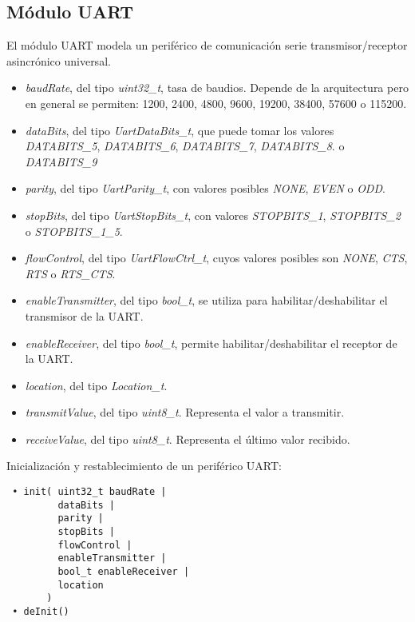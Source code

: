\subsection{Módulo UART}

El módulo UART modela un periférico de comunicación serie transmisor/receptor asincrónico universal.


\begin{itemize}
\item
\emph{baudRate}, del tipo \emph{uint32\_t}, tasa de baudios. Depende de la arquitectura pero en general se permiten: 1200, 2400, 4800, 9600, 19200, 38400, 57600 o 115200.
\item
\emph{dataBits}, del tipo \emph{UartDataBits\_t}, que puede tomar los valores \emph{DATABITS\_5}, \emph{DATABITS\_6}, \emph{DATABITS\_7}, \emph{DATABITS\_8}. o \emph{DATABITS\_9}
\item
\emph{parity}, del tipo \emph{UartParity\_t}, con valores posibles \emph{NONE}, \emph{EVEN} o \emph{ODD}.
\item
\emph{stopBits}, del tipo \emph{UartStopBits\_t}, con valores \emph{STOPBITS\_1}, \emph{STOPBITS\_2} o \emph{STOPBITS\_1\_5}.
\item
\emph{flowControl}, del tipo \emph{UartFlowCtrl\_t}, cuyos valores posibles son \emph{NONE}, \emph{CTS}, \emph{RTS} o \emph{RTS\_CTS}.
\item
\emph{enableTransmitter}, del tipo \emph{bool\_t}, se utiliza para habilitar/deshabilitar el transmisor de la UART.
\item
\emph{enableReceiver}, del tipo \emph{bool\_t}, permite habilitar/deshabilitar el receptor de la UART.
\item
\emph{location}, del tipo \emph{Location\_t}.
\item
\emph{transmitValue}, del tipo \emph{uint8\_t}. Representa el valor a transmitir.
\item
\emph{receiveValue}, del tipo \emph{uint8\_t}. Representa el último valor recibido. 
\end{itemize}


Inicialización y restablecimiento de un periférico UART:

\begin{verbatim}
 • init( uint32_t baudRate | 
         dataBits | 
         parity | 
         stopBits | 
         flowControl |
         enableTransmitter | 
         bool_t enableReceiver |
         location
       )
 • deInit()
\end{verbatim}

